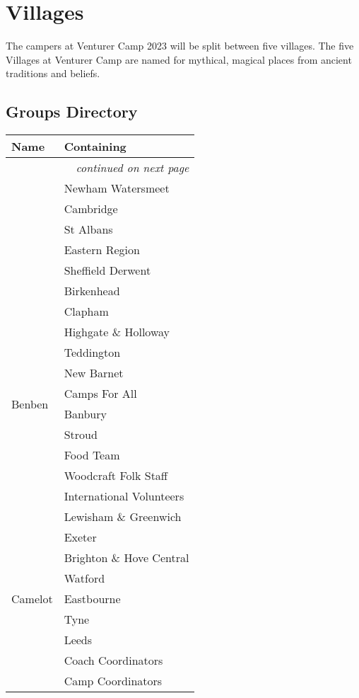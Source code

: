 \documentclass[a4paper, 11pt]{report}
\begin{document}
\chapter{Villages}
The campers at Venturer Camp 2023 will be split between five villages.  The five Villages at Venturer Camp are named for mythical, magical places from ancient traditions and beliefs.
\section{Groups Directory}
{\RaggedRight \centering
\begin{longtable}{p{} p{}}
    \textbf{Name} & \textbf{Containing}\\
        \hline
        \endhead

        \multicolumn{2}{r}{\footnotesize\itshape continued on next page}\\
        \endfoot 
        
        \endlastfoot
        \multirow{6}{*}{Asgard} & Newham Watersmeet\\*
        & Cambridge\\*
        & St Albans\\*
        & Eastern Region\\*
        & Sheffield Derwent\\*
        & Birkenhead\\
        \hline

        \multirow{10}{*}{Benben} & Clapham\\*
        &  Highgate \& Holloway \\*
        &  Teddington \\*
        &  New Barnet \\*
        &  Camps For All \\*
        &  Banbury \\*
        &  Stroud \\*
        &  Food Team \\*
        &  Woodcraft Folk Staff \\*
        &  International Volunteers \\*
        \hline

        \multirow{9}{*}{Camelot} & Lewisham \& Greenwich\\*
        & Exeter \\*
        & Brighton \& Hove Central \\*
        & Watford \\*
        & Eastbourne \\*
        & Tyne \\*
        & Leeds \\*
        & Coach Coordinators \\*
        & Camp Coordinators \\
        \hline


\end{longtable}}
\end{document}
